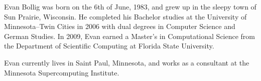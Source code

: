 \begin{biosketch}

Evan Bollig was born on the 6th of June, 1983, and grew up in the sleepy town of Sun Prairie, Wisconsin. He completed his Bachelor studies at the University of Minnesota--Twin Cities in 2006 with dual degrees in Computer Science and German Studies. In 2009, Evan earned a Master's in Computational Science from the Department of Scientific Computing at Florida State University. 

Evan currently lives in Saint Paul, Minnesota, and works as a consultant at the Minnesota Supercomputing Institute. 

\end{biosketch}